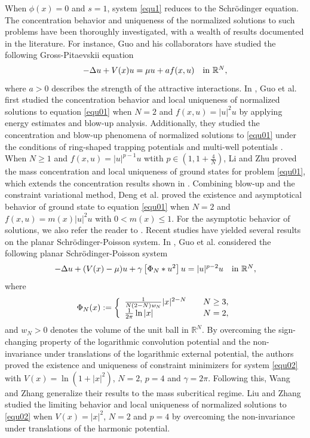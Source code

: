 \documentclass[reqno, 11pt]{amsart} %
\numberwithin{equation}{section}
\begin{document}
	When $\phi(x)=0$ and $s=1$, system \eqref{equ1} reduces to the Schr\"{o}dinger equation. The concentration behavior and uniqueness of the normalized solutions to such problems have been thoroughly investigated, with a wealth of results documented in the literature.  For instance, Guo and his collaborators have studied the following Gross-Pitaevskii equation
	\begin{equation}\label{equ01}
		-\Delta u+V(x)u=\mu u+af(x, u)\quad \hbox{in $\mathbb{R}^{N}$},
	\end{equation}
	where $a>0$ describes the strength of the attractive interactions. In \cite{GLMP,GSIM}, Guo et al. first studied the concentration behavior and local uniqueness of normalized solutions to equation \eqref{equ01} when $N=2$ and $f(x, u)=|u|^{2}u$ by applying energy estimates and blow-up analysis. Additionally, they studied the concentration and blow-up phenomena of normalized solutions to \eqref{equ01} under the conditions of ring-shaped trapping potentials \cite{GAH} and multi-well potentials \cite{GNA}. When $N\geq1$ and $f(x, u)=|u|^{p-1}u$ wtith $p\in(1, 1+\frac{4}{N})$, Li and Zhu \cite{LZ} proved the mass concentration and local uniqueness of ground states for problem \eqref{equ01}, which extends the concentration results shown in \cite{GLMP,GSIM}. Combining blow-up and the constraint variational method, Deng et al. \cite{DC,DJ} proved the existence and asymptotical behavior of ground state to equation \eqref{equ01} when $N=2$ and $f(x, u)=m(x)|u|^{2}u$ with $0<m(x)\leq1$. For the asymptotic behavior of solutions, we also refer the reader to \cite{CWJMPA,LWZ,WWMZ}. Recent studies have yielded several results on the planar Schr\"{o}dinger-Poisson system. In \cite{GJDE}, Guo et al. considered the following planar Schr\"{o}dinger-Poisson system
	\begin{equation}\label{equ02}
		-\Delta u+(V(x)-\mu) u+\gamma\left[ \Phi_{N}\ast u^{2}\right]u=|u|^{p-2}u\quad \hbox{in $\mathbb{R}^{N}$},
	\end{equation}
	where
	\begin{equation*}
		\Phi_{N}(x):=
		\left\{
		\begin{array}{ll}
			\frac{1}{N(2-N)\mathit{w}_{N}} |x|^{2-N}&\quad \hbox{$N\geq3$},\\
			\frac{1}{2\pi}\ln |x|&\quad \hbox{$N=2$},
		\end{array}
		\right.
	\end{equation*}
	and $\mathit{w}_{N}>0$ denotes the volume of the unit ball in $\mathbb{R}^{N}$. By overcoming the sign-changing property of the logarithmic convolution potential and the non-invariance under translations of the logarithmic external potential, the authors proved the existence and uniqueness of constraint minimizers for system \eqref{equ02} with $V(x)=\ln (1+|x|^{2})$, $N=2$, $p=4$ and $\gamma=2\pi$. Following this, Wang and Zhang \cite{WZDCDS} generalize their results to the mass subcritical regime. Liu and Zhang \cite{LZAFA} studied the limiting behavior and local uniqueness of normalized solutions to \eqref{equ02} when $V(x)=|x|^{2}$, $N=2$ and $p=4$ by overcoming the non-invariance under translations of the harmonic potential.
	
\end{document}

